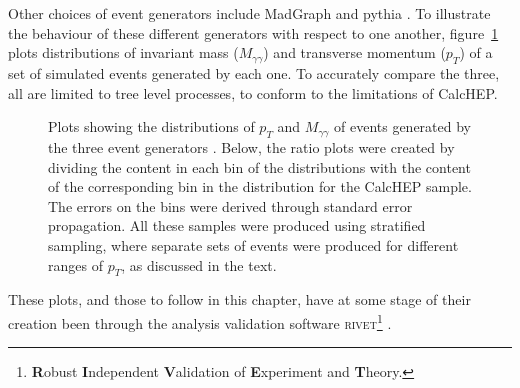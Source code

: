 Other choices of event generators include MadGraph \cite{madgraph5} and pythia \cite{pythia}. To illustrate the behaviour of these different generators with respect to one another, figure~\ref{evgen} plots distributions of invariant mass ($M_{\gamma\gamma}$) and transverse momentum ($p_T$) of a set of simulated events generated by each one. To accurately compare the three, all are limited to tree level processes, to conform to the limitations of CalcHEP.

\begin{figure}[htp]
\begin{minipage}[b]{.69\textwidth}
\begin{infilsf} \tiny
\hspace{-1ex}\makebox[0pt][l]{}
\end{infilsf}
\end{minipage}
\begin{minipage}[b]{.3\textwidth}

\phantom{p}
\end{minipage}
\begin{minipage}[b]{.69\textwidth}
\begin{infilsf} \tiny
\hspace{-1ex}\makebox[0pt][l]{}
\end{infilsf}
\end{minipage}
\begin{minipage}[b]{.3\textwidth}

\phantom{p}
\end{minipage}
\caption{Plots showing the distributions of $p_T$ and $M_{\gamma\gamma}$ of events generated by the three event generators \cite{calchep,pythia,madgraph5}. Below, the ratio plots were created by dividing the content in each bin of the distributions with the content of the corresponding bin in the distribution for the CalcHEP sample. The errors on the bins were derived through standard error propagation. All these samples were produced using stratified sampling, where separate sets of events were produced for different ranges of $p_T$, as discussed in the text.
\label{evgen}}
\end{figure}

These plots, and those to follow in this chapter, have at some stage of their creation been through the analysis validation software \textsc{rivet}\footnote{\textbf{R}obust \textbf{I}ndependent \textbf{V}alidation of \textbf{E}xperiment and \textbf{T}heory.} \cite{rivet}.

